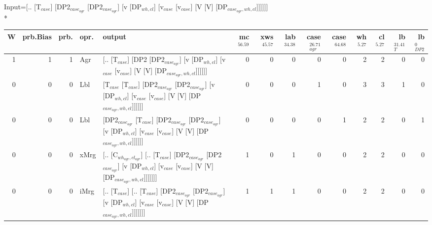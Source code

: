 \begingroup\scriptsize Input=[.. [T$_{case}$] [DP2$_{case_{agr}}$ [DP2$_{case_{agr}}$] [v [DP$_{wh,cl}$] [v$_{case}$ [v$_{case}$] [V [V] [DP$_{case_{agr},wh,cl}$]]]]]]\\*
\begin{tabularx}{\linewidth}{rrrlXrrrrrrrrr}
\hline
   W &   prb.Bias &   prb. & opr.   & output                                                                                                                                                                                                   &   mc$^{56.59}$ &   xws$^{45.57}$ &   lab$^{34.38}$ &   case$_{agr}^{26.71}$ &   case$^{64.68}$ &   wh$^{5.27}$ &   cl$^{5.27}$ &   lb$_{T}^{31.41}$ &   lb$_{DP2}^{0}$ \\
\hline
   1 &       1 &   1 & Agr  & [.. [T$_{case}$] [DP2 [DP2$_{case_{agr}}$] [v [DP$_{wh,cl}$] [v$_{case}$ [v$_{case}$] [V [V] [DP$_{case_{agr},wh,cl}$]]]]]]                                                                                                          &            0 &             0 &             0 &                  0 &              0 &           2 &           2 &              0 &            0 \\
   0 &       0 &   0 & Lbl  & [T$_{case}$ [T$_{case}$] [DP2$_{case_{agr}}$ [DP2$_{case_{agr}}$] [v [DP$_{wh,cl}$] [v$_{case}$ [v$_{case}$] [V [V] [DP$_{case_{agr},wh,cl}$]]]]]]                                                                                             &            0 &             0 &             0 &                  1 &              0 &           3 &           3 &              1 &            0 \\
   0 &       0 &   0 & Lbl  & [DP2$_{case_{agr}}$ [T$_{case}$] [DP2$_{case_{agr}}$ [DP2$_{case_{agr}}$] [v [DP$_{wh,cl}$] [v$_{case}$ [v$_{case}$] [V [V] [DP$_{case_{agr},wh,cl}$]]]]]]                                                                                       &            0 &             0 &             0 &                  0 &              1 &           2 &           2 &              0 &            1 \\
   0 &       0 &   0 & xMrg & [.. [C$_{wh_{agr},cl_{agr}}$] [.. [T$_{case}$] [DP2$_{case_{agr}}$ [DP2$_{case_{agr}}$] [v [DP$_{wh,cl}$] [v$_{case}$ [v$_{case}$] [V [V] [DP$_{case_{agr},wh,cl}$]]]]]]]                                                                          &            1 &             0 &             1 &                  0 &              0 &           2 &           2 &              0 &            0 \\
   0 &       0 &   0 & iMrg & [.. [T$_{case}$] [.. [T$_{case}$] [DP2$_{case_{agr}}$ [DP2$_{case_{agr}}$] [v [DP$_{wh,cl}$] [v$_{case}$ [v$_{case}$] [V [V] [DP$_{case_{agr},wh,cl}$]]]]]]]                                                                                   &            1 &             1 &             1 &                  0 &              0 &           2 &           2 &              0 &            0 \\

\end{tabularx}

